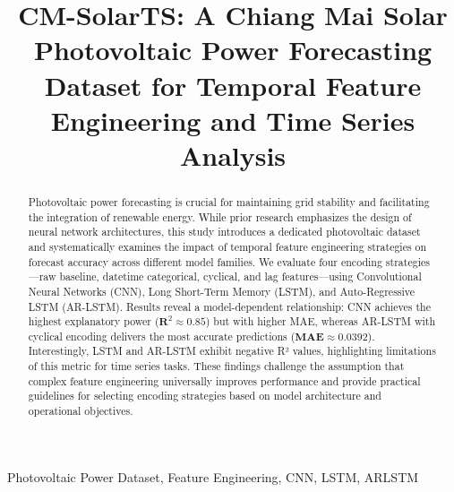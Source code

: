 \documentclass[conference]{IEEEtran}
\begin{document}
	
	\title{CM-SolarTS: A Chiang Mai Solar Photovoltaic Power Forecasting Dataset for Temporal Feature Engineering and Time Series Analysis \\
	}
	
	\author{
		
		\and
	}
	
	\maketitle
	
	\begin{abstract}
		Photovoltaic power forecasting is crucial for maintaining grid stability and facilitating the integration of renewable energy. While prior research emphasizes the design of neural network architectures, this study introduces a dedicated photovoltaic dataset and systematically examines the impact of temporal feature engineering strategies on forecast accuracy across different model families. We evaluate four encoding strategies—raw baseline, datetime categorical, cyclical, and lag features—using Convolutional Neural Networks (CNN), Long Short-Term Memory (LSTM), and Auto-Regressive LSTM (AR-LSTM). Results reveal a model-dependent relationship: CNN achieves the highest explanatory power ($\mathbf{R}^{2} \approx 0.85$) but with higher MAE, whereas AR-LSTM with cyclical encoding delivers the most accurate predictions ($\mathbf{MAE} \approx 0.0392$). Interestingly, LSTM and AR-LSTM exhibit negative R² values, highlighting limitations of this metric for time series tasks. These findings challenge the assumption that complex feature engineering universally improves performance and provide practical guidelines for selecting encoding strategies based on model architecture and operational objectives.
	\end{abstract}
	
	\begin{IEEEkeywords}
		Photovoltaic Power Dataset, Feature Engineering, CNN, LSTM, ARLSTM
	\end{IEEEkeywords}
	
\end{document}
